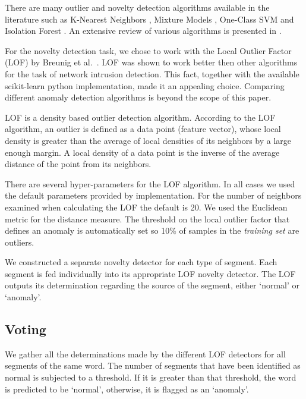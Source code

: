 \documentclass[conference]{IEEEtran}
\begin{document}
  There are many outlier and novelty detection algorithms available in the literature such as K-Nearest Neighbors \cite{hautamaki2004outlier}, Mixture Models \cite{paalanen2006feature}, One-Class SVM \cite{scholkopf2000support} and Isolation Forest \cite{liu2008isolation}. An extensive review of various algorithms is presented in \cite{pimentel2014review}.
  
  For the novelty detection task, we chose to work with the Local Outlier Factor (LOF) by Breunig et al.\ \cite{breunig2000lof}. LOF was shown to work better then other algorithms for the task of network intrusion detection\cite{lazarevic2003comparative}. This fact, together with the available scikit-learn \cite{scikit-learn} python implementation, made it an appealing choice. Comparing different anomaly detection algorithms is beyond the scope of this paper.
  
  LOF is a density based outlier detection algorithm. According to the LOF algorithm, an outlier is defined as a data point (feature vector), whose local density is greater than the average of local densities of its neighbors by a large enough margin. A local density of a data point is the inverse of the average distance of the point from its neighbors.
  
  There are several hyper-parameters for the LOF algorithm. In all cases we used the default parameters provided by implementation. For the number of neighbors examined when calculating the LOF the default is 20. We used the Euclidean metric for the distance measure. The threshold on the local outlier factor that defines an anomaly is automatically set so 10\% of samples in the \textit{training set} are outliers.
  
  We constructed a separate novelty detector for each type of segment. Each segment is fed individually into its appropriate LOF novelty detector. The LOF outputs its determination regarding the source of the segment, either `normal' or `anomaly'.
  
\subsection{Voting}
  We gather all the determinations made by the different LOF detectors for all segments of the same word. The number of segments that have been identified as normal is subjected to a threshold. If it is greater than that threshold, the word is predicted to be `normal', otherwise, it is flagged as an `anomaly'.
  
\end{document}
